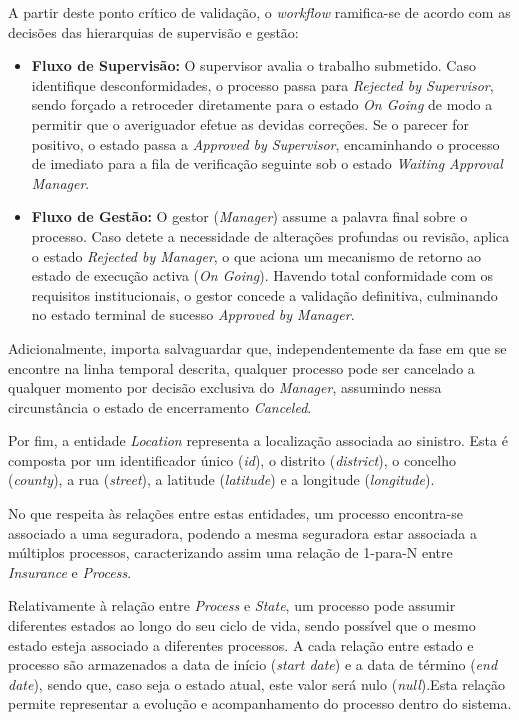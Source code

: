 A partir deste ponto crítico de validação, o \textit{workflow} ramifica-se de acordo com as decisões das hierarquias de supervisão e gestão:
\begin{itemize}
    \item \textbf{Fluxo de Supervisão:} O supervisor avalia o trabalho submetido. Caso identifique desconformidades, o processo passa para \textit{Rejected by Supervisor}, sendo forçado a retroceder diretamente para o estado \textit{On Going} de modo a permitir que o averiguador efetue as devidas correções. Se o parecer for positivo, o estado passa a \textit{Approved by Supervisor}, encaminhando o processo de imediato para a fila de verificação seguinte sob o estado \textit{Waiting Approval Manager}.
    \item \textbf{Fluxo de Gestão:} O gestor (\textit{Manager}) assume a palavra final sobre o processo. Caso detete a necessidade de alterações profundas ou revisão, aplica o estado \textit{Rejected by Manager}, o que aciona um mecanismo de retorno ao estado de execução activa (\textit{On Going}). Havendo total conformidade com os requisitos institucionais, o gestor concede a validação definitiva, culminando no estado terminal de sucesso \textit{Approved by Manager}.
\end{itemize}

Adicionalmente, importa salvaguardar que, independentemente da fase em que se encontre na linha temporal descrita, qualquer processo pode ser cancelado a qualquer momento por decisão exclusiva do \textit{Manager}, assumindo nessa circunstância o estado de encerramento \textit{Canceled}.



Por fim, a entidade \textit{Location} representa a localização associada ao sinistro. Esta é composta por um identificador único (\textit{id}), o distrito (\textit{district}), o concelho (\textit{county}), a rua (\textit{street}), a latitude (\textit{latitude}) e a longitude (\textit{longitude}).

No que respeita às relações entre estas entidades, um processo encontra-se associado a uma seguradora, podendo a mesma seguradora estar associada a múltiplos processos, caracterizando assim uma relação de 1-para-N entre \textit{Insurance} e \textit{Process}.

Relativamente à relação entre \textit{Process} e \textit{State}, um processo pode assumir diferentes estados ao longo do seu ciclo de vida, sendo possível que o mesmo estado esteja associado a diferentes processos. A cada relação entre estado e processo são armazenados a data de início (\textit{start date}) e a data de término (\textit{end date}), sendo que, caso seja o estado atual, este valor será nulo (\textit{null}).Esta relação permite representar a evolução e acompanhamento do processo dentro do sistema.

